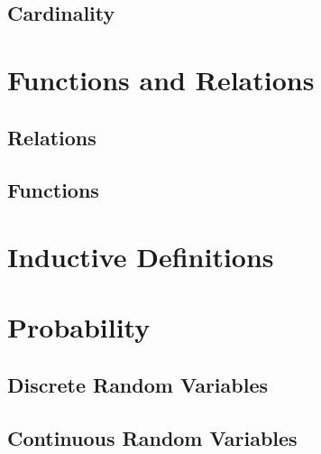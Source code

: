 \documentclass{article}
\begin{document}
	\subsection{Cardinality}

	\section{Functions and Relations}
	\subsection{Relations}
	\subsection{Functions}
	
	\section{Inductive Definitions}
	
	\section{Probability}
	\subsection{Discrete Random Variables}
	\subsection{Continuous Random Variables}
	
	\newpage
	\printindex
\end{document}
